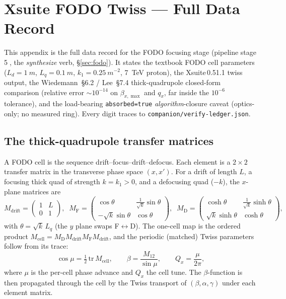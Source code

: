 \section{Xsuite FODO Twiss --- Full Data Record}
\label{app:fodo}

This appendix is the full data record for the FODO focusing stage
(pipeline stage \textcircled{\scriptsize 5}, the \emph{synthesize} verb,
\S\ref{sec:fodo}). It states the textbook FODO cell parameters
($L_d\!=\!\SI{1}{m}$, $L_q\!=\!\SI{0.1}{m}$, $k_1\!=\!\SI{0.25}{m^{-2}}$,
\SI{7}{TeV} proton), the Xsuite\,0.51.1 twiss output, the
Wiedemann~\S6.2 / Lee~\S7.4 thick-quadrupole closed-form comparison
(relative error $\sim\!10^{-14}$ on $\beta_{x,\max}$ and $q_x$, far
inside the $10^{-6}$ tolerance), and the load-bearing
\texttt{absorbed=true} \emph{algorithm}-closure caveat (optics-only;
no measured ring). Every digit traces to
\texttt{companion/verify-ledger.json}.

\subsection{The thick-quadrupole transfer matrices}
\label{app:fodo-eq}

A FODO cell is the sequence drift--focus--drift--defocus. Each element is
a $2\times 2$ transfer matrix in the transverse phase space $(x,x')$.
For a drift of length $L$, a focusing thick quad of strength
$k=k_1>0$, and a defocusing quad ($-k$), the $x$-plane matrices are
\citep{wiedemann2015,lee2004}
\begin{equation}
M_{\text{drift}}=\begin{pmatrix}1 & L\\ 0 & 1\end{pmatrix},
\;\;
M_{\text{F}}=\begin{pmatrix}\cos\theta & \tfrac{1}{\sqrt{k}}\sin\theta\\
   -\sqrt{k}\sin\theta & \cos\theta\end{pmatrix},
\;\;
M_{\text{D}}=\begin{pmatrix}\cosh\theta & \tfrac{1}{\sqrt{k}}\sinh\theta\\
   \sqrt{k}\sinh\theta & \cosh\theta\end{pmatrix},
\label{eq:app-fodo-mat}
\end{equation}
with $\theta=\sqrt{k}\,L_q$ (the $y$ plane swaps F$\leftrightarrow$D).
The one-cell map is the ordered product
$M_{\text{cell}}=M_{\text{D}}M_{\text{drift}}M_{\text{F}}M_{\text{drift}}$,
and the periodic (matched) Twiss parameters follow from its trace:
\begin{equation}
\cos\mu = \tfrac12\,\mathrm{tr}\,M_{\text{cell}},
\qquad
\beta = \frac{M_{12}}{\sin\mu},
\qquad
Q_x = \frac{\mu}{2\pi},
\label{eq:app-fodo-twiss}
\end{equation}
where $\mu$ is the per-cell phase advance and $Q_x$ the cell tune. The
$\beta$-function is then propagated through the cell by the Twiss
transport of $(\beta,\alpha,\gamma)$ under each element matrix.

